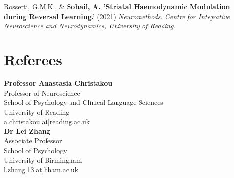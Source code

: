 \documentclass[a4paper,10pt]{article}
\begin{document}
Rossetti, G.M.K., \& \textbf{Sohail, A. 'Striatal Haemodynamic Modulation during Reversal Learning.'} (2021)
\textit{Neuromethods. Centre for Integrative Neuroscience and Neurodynamics, University of Reading.}
\vspace{4pt}

\section{Referees}
\vspace{2pt}
\textbf{Professor Anastasia Christakou} \\
Professor of Neuroscience \\
School of Psychology and Clinical Language Sciences \\
University of Reading \\
a.christakou[at]reading.ac.uk \\
\vspace{8pt}
\textbf{Dr Lei Zhang} \\
Associate Professor \\
School of Psychology \\
University of Birmingham \\
l.zhang.13[at]bham.ac.uk




\end{document}

